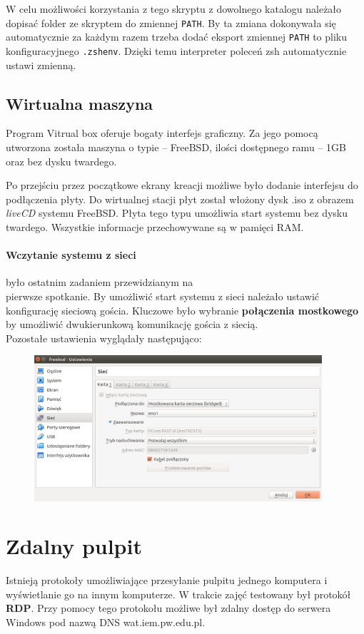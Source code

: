 \documentclass{article}
\begin{document}
W celu możliwości korzystania z tego skryptu z dowolnego katalogu należało dopisać folder ze skryptem do zmiennej \texttt{PATH}. By ta zmiana dokonywała się automatycznie za każdym razem trzeba dodać eksport zmiennej \texttt{PATH} to pliku konfiguracyjnego \texttt{.zshenv}. Dzięki temu interpreter poleceń zsh automatycznie ustawi zmienną.

\subsection{Wirtualna maszyna}
Program Vitrual box oferuje bogaty interfejs graficzny. Za jego pomocą utworzona została maszyna o typie -- FreeBSD, ilości dostępnego ramu -- 1GB oraz bez dysku twardego.

Po przejściu przez początkowe ekrany kreacji możliwe było dodanie interfejsu do podłączenia płyty. Do wirtualnej stacji płyt został włożony dysk .iso z obrazem \textit{liveCD} systemu FreeBSD. Płyta tego typu umożliwia start systemu bez dysku twardego. Wszystkie informacje przechowywane są w pamięci RAM.

\paragraph{Wczytanie systemu z sieci} było ostatnim zadaniem przewidzianym na \\ pierwsze spotkanie. By umożliwić start systemu z sieci należało ustawić konfigurację sieciową gościa. Kluczowe było wybranie \textbf{połączenia mostkowego} by umożliwić dwukierunkową komunikację gościa z siecią. \\ Pozostałe ustawienia wyglądały następująco:
\begin{figure}[h]
    \centering
    \includegraphics[width=0.95\textwidth]{ustawienia_karty_sieciowej}
\end{figure}

\section{Zdalny pulpit}
Istnieją protokoły umożliwiające przesyłanie pulpitu jednego komputera i wyświetlanie go na innym komputerze. W trakcie zajęć testowany był protokół \textbf{RDP}. Przy pomocy tego protokołu możliwe był zdalny dostęp do serwera Windows pod nazwą DNS wat.iem.pw.edu.pl.
\end{document}
